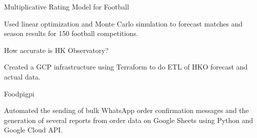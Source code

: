 

\begin{cventries}

  \cventry
    {Multiplicative Rating Model for Football} %
    {} %
    {} %
    {} %
    {
      \begin{cvitems} %
        \item {Used linear optimization and Monte Carlo simulation to forecast matches and season results for 150 football competitions.}
      \end{cvitems}
    }

  \cventry
    {How accurate is HK Observatory?} %
    {} %
    {} %
    {} %
    {
      \begin{cvitems} %
        \item {Created a GCP infrastructure using Terraform to do ETL of HKO forecast and actual data.}
      \end{cvitems}
    }

  \cventry
    {Foodpigpi} %
    {} %
    {} %
    {} %
    {
      \begin{cvitems} %
        \item {Automated the sending of bulk WhatsApp order confirmation messages and the generation of several reports from order data on Google Sheets using Python and Google Cloud API.}
      \end{cvitems}
    }

\end{cventries}
